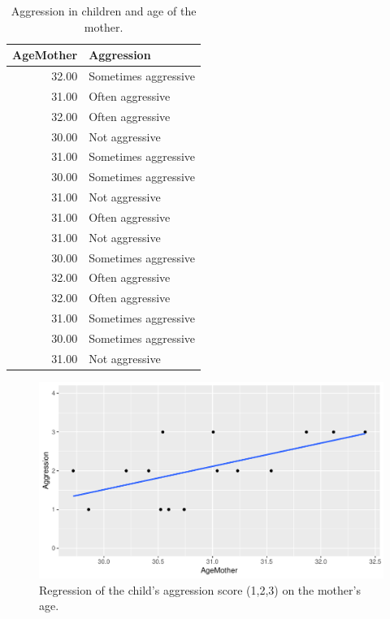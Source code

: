 \documentclass[]{book}\usepackage[]{graphicx}\usepackage[]{color}
\makeatletter
\def\maxwidth{ %
  \ifdim\Gin@nat@width>\linewidth
    \linewidth
  \else
    \Gin@nat@width
  \fi
}
\newenvironment{knitrout}{}{} %
\makeatother
\begin{document}
\begin{table}[ht]
\centering
\caption{Aggression in children and age of the mother.} 
\label{tab:nonpar_1}
\begin{tabular}{rl}
  \hline
AgeMother & Aggression \\ 
  \hline
32.00 & Sometimes aggressive \\ 
  31.00 & Often aggressive \\ 
  32.00 & Often aggressive \\ 
  30.00 & Not aggressive \\ 
  31.00 & Sometimes aggressive \\ 
  30.00 & Sometimes aggressive \\ 
  31.00 & Not aggressive \\ 
  31.00 & Often aggressive \\ 
  31.00 & Not aggressive \\ 
  30.00 & Sometimes aggressive \\ 
  32.00 & Often aggressive \\ 
  32.00 & Often aggressive \\ 
  31.00 & Sometimes aggressive \\ 
  30.00 & Sometimes aggressive \\ 
  31.00 & Not aggressive \\ 
   \hline
\end{tabular}
\end{table}




\begin{knitrout}
\color{fgcolor}\begin{figure}

{\centering \includegraphics[width=\maxwidth]{figure/fig101-1} 

}

\caption[Regression of the child's aggression score (1,2,3) on the mother's age]{Regression of the child's aggression score (1,2,3) on the mother's age.}\label{fig:fig101}
\end{figure}


\end{knitrout}
\end{document}
